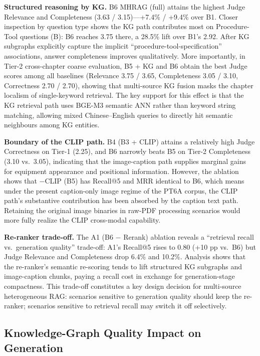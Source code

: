 \documentclass[applsci,article,submit,pdftex,moreauthors]{Definitions/mdpi}
\begin{document}
\textbf{Structured reasoning by KG.} B6 MHRAG (full) attains the highest Judge Relevance and Completeness (3.63 / 3.15)---{+}7.4\% / {+}9.4\% over B1. Closer inspection by question type shows the KG path contributes most on Procedure-Tool questions (B): B6 reaches 3.75 there, a 28.5\% lift over B1's 2.92. After KG subgraphs explicitly capture the implicit ``procedure-tool-specification'' associations, answer completeness improves qualitatively. More importantly, in Tier-2 cross-chapter coarse evaluation, B5 + KG and B6 obtain the best Judge scores among all baselines (Relevance 3.75 / 3.65, Completeness 3.05 / 3.10, Correctness 2.70 / 2.70), showing that multi-source KG fusion masks the chapter localism of single-keyword retrieval. The key support for this effect is that the KG retrieval path uses BGE-M3 semantic ANN rather than keyword string matching, allowing mixed Chinese--English queries to directly hit semantic neighbours among KG entities.

\textbf{Boundary of the CLIP path.} B4 (B3 + CLIP) attains a relatively high Judge Correctness on Tier-1 (2.25), and B6 narrowly beats B5 on Tier-2 Completeness (3.10 vs.\ 3.05), indicating that the image-caption path supplies marginal gains for equipment appearance and positional information. However, the ablation shows that $-$CLIP (B5) has Recall@5 and MRR identical to B6, which means under the present caption-only image regime of the PT6A corpus, the CLIP path's substantive contribution has been absorbed by the caption text path. Retaining the original image binaries in raw-PDF processing scenarios would more fully realize the CLIP cross-modal capability.

\textbf{Re-ranker trade-off.} The A1 (B6 $-$ Rerank) ablation reveals a ``retrieval recall vs.\ generation quality'' trade-off: A1's Recall@5 rises to 0.80 ({+}10 pp vs.\ B6) but Judge Relevance and Completeness drop 6.4\% and 10.2\%. Analysis shows that the re-ranker's semantic re-scoring tends to lift structured KG subgraphs and image-caption chunks, paying a recall cost in exchange for generation-stage compactness. This trade-off constitutes a key design decision for multi-source heterogeneous RAG: scenarios sensitive to generation quality should keep the re-ranker; scenarios sensitive to retrieval recall may switch it off selectively.

\subsection{Knowledge-Graph Quality Impact on Generation}
\label{sec:disc-kg-quality}
\end{document}
